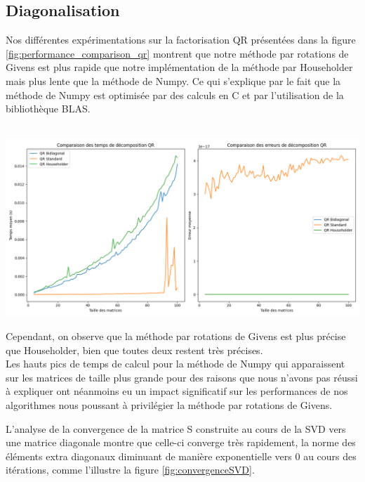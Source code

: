 \documentclass{article}
\begin{document}
\subsection{Diagonalisation}
Nos différentes expérimentations sur la factorisation QR présentées dans la figure \ref{fig:performance_comparison_qr} montrent que notre méthode par rotations de Givens est plus rapide que notre implémentation de la méthode par Householder mais plus lente que la méthode de Numpy. Ce qui s'explique par le fait que la méthode de Numpy est optimisée par des calculs en C et par l'utilisation de la bibliothèque BLAS.\\ \\
\begin{minipage}{0.6\textwidth}
  \centering
  \includegraphics[width=\textwidth]{qr_comparaison.png}
  \label{fig:performance_comparison_qr}
\end{minipage}
\hfill
\begin{minipage}{0.37\textwidth}
Cependant, on observe que la méthode par rotations de Givens est plus précise que Householder, bien que toutes deux restent très précises.\\
Les hauts pics de temps de calcul pour la méthode de Numpy qui apparaissent sur les matrices de taille plus grande pour des raisons que nous n'avons pas réussi à expliquer ont néanmoins eu un impact significatif sur les performances de nos algorithmes nous poussant à privilégier la méthode par rotations de Givens.
\end{minipage}
L'analyse de la convergence de la matrice S construite au cours de la SVD vers une matrice diagonale montre que celle-ci converge très rapidement, la norme des éléments extra diagonaux diminuant de manière exponentielle vers 0 au cours des itérations, comme l'illustre la figure \ref{fig:convergenceSVD}.
\end{document}
